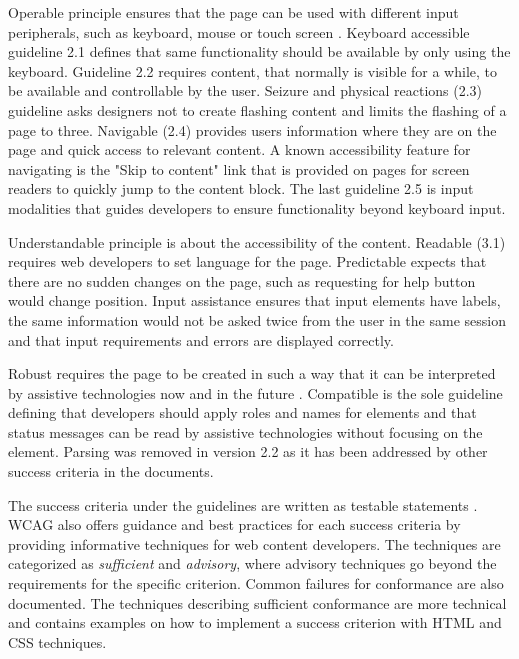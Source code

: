 Operable principle ensures that the page can be used with different input peripherals, such as keyboard, mouse or touch screen \cite{wcag22}. Keyboard accessible guideline 2.1 defines that same functionality should be available by only using the keyboard. Guideline 2.2 requires content, that normally is visible for a while, to be available and controllable by the user. Seizure and physical reactions (2.3) guideline asks designers not to create flashing content and limits the flashing of a page to three. Navigable (2.4) provides users information where they are on the page and quick access to relevant content. A known accessibility feature for navigating is the "Skip to content" link that is provided on pages for screen readers to quickly jump to the content block. The last guideline 2.5 is input modalities that guides developers to ensure functionality beyond keyboard input.

Understandable principle is about the accessibility of the content. Readable (3.1) requires web developers to set language for the page. Predictable expects that there are no sudden changes on the page, such as requesting for help button would change position. Input assistance ensures that input elements have labels, the same information would not be asked twice from the user in the same session and that input requirements and errors are displayed correctly. 

Robust requires the page to be created in such a way that it can be interpreted by assistive technologies now and in the future \citep{wcag22}. Compatible is the sole guideline defining that developers should apply roles and names for elements and that status messages can be read by assistive technologies without focusing on the element. Parsing was removed in version 2.2 as it has been addressed by other success criteria in the documents.

The success criteria under the guidelines are written as testable statements \citep{wcag22}. WCAG also offers guidance and best practices for each success criteria by providing informative techniques for web content developers. The techniques are categorized as \textit{sufficient} and \textit{advisory}, where advisory techniques go beyond the requirements for the specific criterion. Common failures for conformance are also documented. The techniques describing sufficient conformance are more technical and contains examples on how to implement a success criterion with HTML and CSS techniques.


